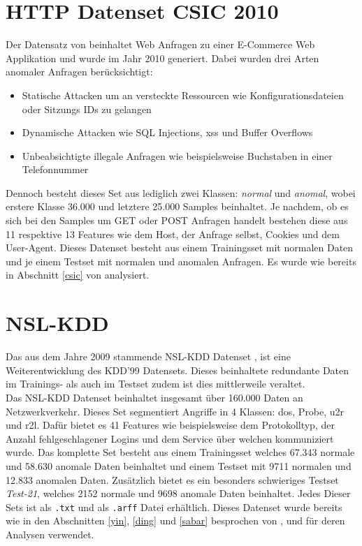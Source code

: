 \documentclass[
    12pt, %
    DIV10,
    ngerman, %
    a4paper, %
    oneside, %
    titlepage, %
    parskip=half, %
    headings=normal, %
    listof=totoc, %
    bibliography=totoc, %
    index=totoc, %
    captions=tableheading, %
    final %
]{scrreprt}
\begin{document}
\section{HTTP Datenset CSIC 2010}
Der Datensatz von \textcite{csic} beinhaltet Web Anfragen zu einer E-Commerce Web Applikation und wurde im Jahr 2010 generiert. Dabei wurden drei Arten anomaler Anfragen berücksichtigt:
\begin{itemize}
\item Statische Attacken um an versteckte Ressourcen wie Konfigurationsdateien oder Sitzungs IDs zu gelangen
\item Dynamische Attacken wie SQL Injections, \ac{xss} und Buffer Overflows
\item Unbeabsichtigte illegale Anfragen wie beispielsweise Buchstaben in einer Telefonnummer 
\end{itemize}
Dennoch besteht dieses Set aus lediglich zwei Klassen: \emph{normal} und \emph{anomal}, wobei erstere Klasse 36.000 und letztere 25.000 Samples beinhaltet.
Je nachdem, ob es sich bei den Samples um GET oder POST Anfragen handelt bestehen diese aus 11 respektive 13 Features wie dem Host, der Anfrage selbst, Cookies und dem User-Agent. Dieses Datenset besteht aus einem Trainingsset mit normalen Daten und je einem Testset mit normalen und anomalen Anfragen. Es wurde wie bereits in Abschnitt \ref{csic} von \textcite{Pham2016} analysiert.
\section{NSL-KDD}
Das aus dem Jahre 2009 stammende NSL-KDD Datenset \parencite{Cybersecurity}, ist eine Weiterentwicklung des KDD'99 Datensets. Dieses beinhaltete redundante Daten im Trainings- als auch im Testset zudem ist dies mittlerweile veraltet.\\
Das NSL-KDD Datenset beinhaltet insgesamt über 160.000 Daten an Netzwerkverkehr. Dieses Set segmentiert Angriffe in 4 Klassen: \ac{dos}, Probe, \ac{u2r} und \ac{r2l}. Dafür bietet es 41 Features wie beispielsweise dem Protokolltyp, der Anzahl fehlgeschlagener Logins und dem Service über welchen kommuniziert wurde. Das komplette Set besteht aus einem Trainingsset welches 67.343 normale und 58.630 anomale Daten beinhaltet und einem Testset mit 9711 normalen und 12.833 anomalen Daten. Zusätzlich bietet es ein besonders schwieriges Testset \emph{Test-21}, welches 2152 normale und 9698 anomale Daten beinhaltet. Jedes Dieser Sets ist als \texttt{.txt} und als \texttt{.arff} Datei erhältlich.
Dieses Datenset wurde bereits wie in den Abschnitten \ref{yin}, \ref{ding} und \ref{sabar} besprochen von \textcite{Yin2017}, \textcite{Ding2018} und \textcite{Sabar2018} für deren Analysen verwendet.
\end{document}
